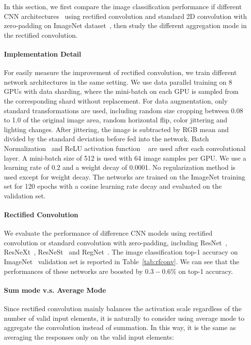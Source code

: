 \documentclass{article}
\begin{document}
In this section, we first compare the image classification performance if different CNN architectures~\cite{he2015deep,xie2016aggregated,zhang2020resnest,radosavovic2020designing} using rectified convolution and standard 2D convolution with zero-padding on ImageNet dataset~\cite{imagenet}, then study the different aggregation mode in the rectified convolution. 



\paragraph{Implementation Detail}

For easily measure the improvement of rectified convolution, we train different network architectures in the same setting. 
We use data parallel training on 8 GPUs with data sharding, where the mini-batch on each GPU is sampled from the corresponding shard without replacement. 
For data augmentation, only standard transformations are used, including random size cropping between 0.08 to 1.0 of the original image area, random horizontal flip, color jittering and lighting changes. 
After jittering, the image is subtracted by RGB mean and divided by the standard deviation before fed into the network. 
Batch Normalization~\cite{ioffe2015batch} and ReLU activation function ~\cite{nair2010rectified} are used after each convolutional layer. 
A mini-batch size of 512 is used with 64 image samples per GPU. 
We use a learning rate of 0.2 and a weight decay of 0.0001. 
No regularization method is used except for weight decay. The networks are trained on the ImageNet training set for 120 epochs with a cosine learning rate decay and evaluated on the validation set. 

\paragraph{Rectified Convolution}

We evaluate the performance of difference CNN models using rectified convolution or standard convolution with zero-padding, including ResNet~\cite{he2015deep}, ResNeXt~\cite{xie2016aggregated}, ResNeSt~\cite{zhang2020resnest} and RegNet~\cite{radosavovic2020designing}.
The image classification top-1 accuracy on ImageNet~\cite{imagenet} validation set is reported in Table~\ref{tab:rfconv}. 
We can see that the performances of these networks are boosted by $0.3-0.6\%$ on top-1 accuracy. 


\paragraph{Sum mode v.s. Average Mode}
Since rectified convolution mainly balances the activation scale regardless of the number of valid input elements, it is naturally to consider using average mode to aggregate the convolution instead of summation. 
In this way, it is the same as averaging the responses only on the valid input elements:
\end{document}
